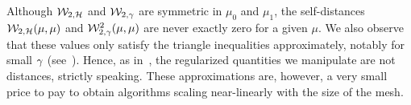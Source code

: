 
Although $\mathcal W_{2,\mathcal H}$ and $\mathcal W_{2,\gamma}$
are symmetric in $\mu_0$ and $\mu_1$, the self-distances $\mathcal W_{2,\mathcal H}(\mu,\mu)$ and $\mathcal W^2_{2,\gamma}(\mu,\mu)$ are never exactly zero for a given $\mu$.   We also observe that these values only satisfy the triangle inequalities approximately, notably for small $\gamma$ (see~\cite[Theorem 1]{cuturi-2013}).   Hence, as in~\cite{crane-2013}, the regularized quantities we manipulate are not distances, strictly speaking. These approximations are, however, a very small price to pay to obtain algorithms scaling near-linearly with the size of the mesh.


% 

